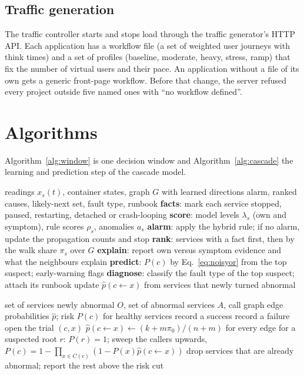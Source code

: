 \subsection{Traffic generation}
The traffic controller starts and stops load through the traffic generator's HTTP API. Each application has a workflow file (a set of weighted user journeys with think times) and a set of profiles (baseline, moderate, heavy, stress, ramp) that fix the number of virtual users and their pace. An application without a file of its own gets a generic front-page workflow. Before that change, the server refused every project outside five named ones with ``no workflow defined''.

\section{Algorithms}
Algorithm~\ref{alg:window} is one decision window and Algorithm~\ref{alg:cascade} the learning and prediction step of the cascade model.

\begin{algorithm}[!htbp]
\caption{One decision window of the diagnosis assistant}
\label{alg:window}
\begin{algorithmic}[1]
\Require readings $x_s(t)$, container states, graph $G$ with learned directions
\Ensure alarm, ranked causes, likely-next set, fault type, runbook
\State \textbf{facts}: mark each service stopped, paused, restarting, detached or crash-looping
\State \textbf{score}: model levels $\lambda_s$ (own and symptom), rule scores $\rho_s$, anomalies $a_s$
\State \textbf{alarm}: apply the hybrid rule; if no alarm, update the propagation counts and stop
\State \textbf{rank}: services with a fact first, then by the walk share $\pi_s$ over $G$
\State \textbf{explain}: report own versus symptom evidence and what the neighbours explain
\State \textbf{predict}: $P(c)$ by Eq.~\eqref{eq:noisyor} from the top suspect; early-warning flags
\State \textbf{diagnose}: classify the fault type of the top suspect; attach its runbook
\State update $\hat p(c \leftarrow x)$ from services that newly turned abnormal
\end{algorithmic}
\end{algorithm}

\begin{algorithm}[!htbp]
\caption{Learning propagation and predicting the next services}
\label{alg:cascade}
\begin{algorithmic}[1]
\Require set of services newly abnormal $O$, set of abnormal services $A$, call graph
\Ensure edge probabilities $\hat p$; risk $P(c)$ for healthy services
   record a success  record a failure \EndIf
\EndFor
{} open the trial $(c,x)$ \EndFor
\State $\hat p(c \leftarrow x) \gets (k + m\pi_0)/(n + m)$ for every edge
\State for a suspected root $r$: $P(r) = 1$; sweep the callers upwards, $P(c) = 1 - \prod_{x \in C(c)} (1 - P(x)\hat p(c \leftarrow x))$
\State drop services that are already abnormal; report the rest above the risk cut
\end{algorithmic}
\end{algorithm}

